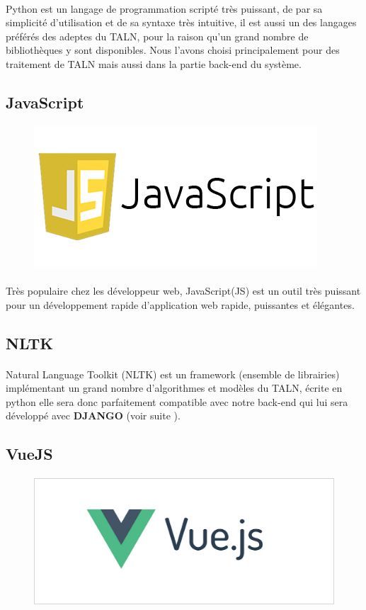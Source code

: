 \documentclass[]{report}
\begin{document}
			\paragraph{}
			Python est un langage de programmation scripté très puissant, de par sa simplicité d'utilisation et de sa syntaxe
			très intuitive, il est aussi un des langages préférés des adeptes du TALN, pour la raison qu'un grand nombre de 
			bibliothèques y sont disponibles. Nous l'avons choisi principalement pour des traitement de TALN mais aussi dans la partie
			back-end  du système.
		\subsection{JavaScript}
			\begin{figure}[H]
				\centering
				\includegraphics[width=0.25\linewidth]{images/js.png}
			\end{figure}
			\paragraph{}
			Très populaire chez les développeur web, JavaScript(JS) est un outil très puissant pour un développement rapide d'application web rapide, puissantes et élégantes.
		\subsection{NLTK}
			\paragraph{}
			 Natural Language Toolkit (NLTK) est un framework (ensemble de librairies) implémentant un grand nombre d'algorithmes et modèles du TALN, écrite en python elle sera donc parfaitement compatible avec notre back-end qui lui sera développé avec \textbf{DJANGO} (voir suite ).
		\subsection{VueJS}
			\paragraph{}
			\begin{figure}[H]
				\centering
				\includegraphics[width=0.25\linewidth]{images/vjs.png}
			\end{figure}
\end{document}
